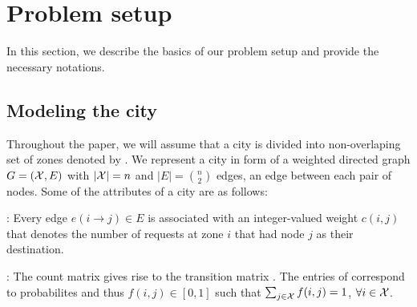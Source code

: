 
\section{Problem setup}
\label{sec:problem_setup}

In this section, we describe the basics of our problem setup and provide the necessary notations.

\iffalse
\subsection{Notation}
\label{sec:notation}

Vectors are denoted with lowercase bold letters (e.g., $\vec{a} = [a(i)]$) and matrices are denoted with uppercase bold letters (e.g., $\matr{A} = [a(i,j)]$). The notation $\vec{1}$ refers to the vector of ones, with size dependent on the context. The short form notation $\vec{A_i}$ refers to the $i$-th row vector of the matrix $\matr{A}$. Let $\Theta_n$ be a set of $n \times n$ right-stochastic transition matrices (non-negative matrices with rows that sum to one). A probability simplex in $\mathbb{R}^n$ is denoted by $\Delta_n = \{\vec{p} \in \mathbb{R}^n_+ : \transpose{p} \vec{1} = 1 \}$.
\fi

\subsection{Modeling the city}

Throughout the paper, we will assume that a city is divided into non-overlaping set of zones denoted by \cityzones. 
We represent a city in form of a weighted directed graph $G=(\mathcal{X}, E)$ with 
$|\mathcal{X}| = n$ and $|E| = {n \choose 2}$ edges, an edge between each pair of nodes. 
Some of the attributes of a city are as follows:


: 
Every edge $e(i\rightarrow j) \in E$ is associated with an
integer-valued weight $c(i,j)$ that denotes the number of requests
at zone $i$ that had node $j$ as their destination.

:
The count matrix gives rise to the transition matrix {\empiricaltransitionmatrix}.
The entries of {\empiricaltransitionmatrix} correspond to probabilites and thus
$f(i,j) \in [0,1]$ such that
$\sum_{j \in \mathcal{X}} f(i,j) = 1$, $\forall i \in \mathcal{X}$.

